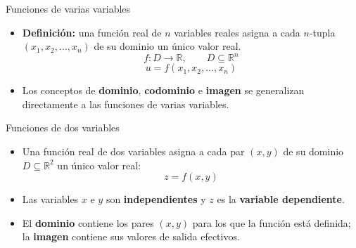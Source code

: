 \documentclass[main.tex]{subfiles}
\begin{document}
\begin{frame}{Funciones de varias variables}
  \begin{itemize}
    \item \textbf{Definición:} una función real de $n$ variables reales
          asigna a cada $n$-tupla $(x_1,x_2,\ldots,x_n)$ de su dominio
          un único valor real.
          \[
            f:D\longrightarrow\mathbb{R},\qquad D\subseteq\mathbb{R}^n
          \]
          \[
            u=f(x_1,x_2,\ldots,x_n)
          \]

    \item Los conceptos de \textbf{dominio}, \textbf{codominio}
          e \textbf{imagen} se generalizan directamente a las funciones
          de varias variables.
  \end{itemize}

  \begin{center}
  \end{center}
\end{frame}

\begin{frame}{Funciones de dos variables}
  \begin{itemize}
    \item Una función real de dos variables asigna a cada par $(x,y)$
          de su dominio $D\subseteq\mathbb{R}^2$ un único valor real:
          \[
            z=f(x,y)
          \]

    \item Las variables $x$ e $y$ son \textbf{independientes} y $z$
          es la \textbf{variable dependiente}.

    \item El \textbf{dominio} contiene los pares $(x,y)$ para los que
          la función está definida; la \textbf{imagen} contiene sus
          valores de salida efectivos.
  \end{itemize}

\end{frame}
\end{document}
